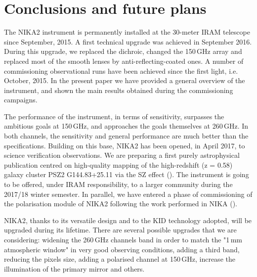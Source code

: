 \documentclass[]{aa} %
\begin{document}
%
%

\section{Conclusions and future plans}

The NIKA2 instrument is permanently installed at the 30-meter IRAM telescope since September, 2015. A first technical upgrade was achieved in September 2016. During this upgrade, we replaced the dichroic, changed the 150\,GHz array and replaced most of the smooth lenses by anti-reflecting-coated ones. A number of commissioning observational runs have been achieved since the first light, i.e. October, 2015. In the present paper we have provided a general overview of the instrument, and shown the main results obtained during the commissioning campaigns. 

The performance of the instrument, in terms of sensitivity, surpasses the ambitious goals at 150\,GHz, and approaches the goals themselves at 260\,GHz. In both channels, the sensitivity and general performance are much better than the specifications. 
Building on this base, NIKA2 has been opened, in April 2017, to science verification observations. We are preparing a first purely astrophysical publication centred on high-quality mapping of the high-redshift (z = 0.58) galaxy cluster PSZ2 G144.83+25.11 via the SZ effect (\cite{Ruppin2017}). The instrument is going to be offered, under IRAM responsibility, to a larger community during the 2017/18 winter semester. In parallel, we have entered a phase of commissioning of the polarisation module of NIKA2 following the work performed in NIKA (\cite{Ritacco2017}). 

NIKA2, thanks to its versatile design and to the KID technology adopted, will be upgraded during its lifetime. There are several possible upgrades that we are considering: widening the 260\,GHz channels band in order to match the "1\,mm atmospheric window" in very good observing conditions, adding a third band, reducing the pixels size, adding a polarised channel at 150\,GHz, increase the illumination of the primary mirror and others. 
\end{document}
